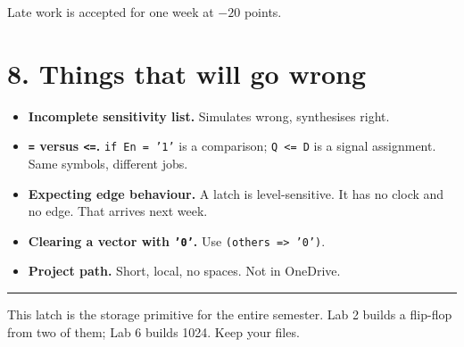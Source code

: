 \documentclass[11pt]{article}
\newcommand{\code}[1]{\texttt{#1}}
\newcommand{\hr}{\vspace{2pt}\hrule\vspace{6pt}}
\begin{document}
Late work is accepted for one week at $-20$ points.

\section*{8. Things that will go wrong}

\begin{itemize}[leftmargin=1.6em,itemsep=1pt]
\item \textbf{Incomplete sensitivity list.} Simulates wrong, synthesises right.
\item \textbf{\code{=} versus \code{<=}.} \code{if En = '1'} is a comparison;
\code{Q <= D} is a signal assignment. Same symbols, different jobs.
\item \textbf{Expecting edge behaviour.} A latch is level-sensitive. It has no
clock and no edge. That arrives next week.
\item \textbf{Clearing a vector with \code{'0'}.} Use \code{(others => '0')}.
\item \textbf{Project path.} Short, local, no spaces. Not in OneDrive.
\end{itemize}

\vspace{10pt}
\hr
{\small This latch is the storage primitive for the entire semester. Lab 2 builds a
flip-flop from two of them; Lab 6 builds 1024. Keep your files.}
\end{document}
